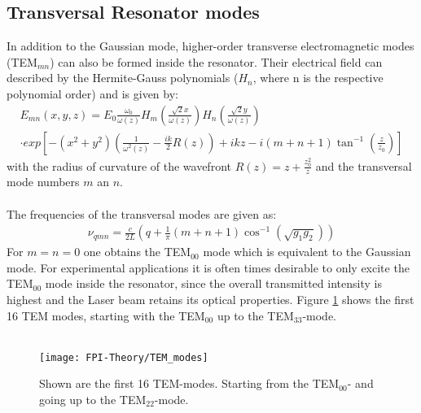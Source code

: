 \subsection{Transversal Resonator modes}
In addition to the Gaussian mode, higher-order transverse electromagnetic modes (TEM$_{mn}$) can also be formed inside the resonator. Their electrical field can described by the Hermite-Gauss polynomials ($H_n$, where n is the respective polynomial order) and is given by:
\begin{eqnarray}
	E_{mn}(x,y,z)=E_0\frac{\omega_0}{\omega(z)} H_m (\frac{\sqrt{2}x}{\omega(z)})H_n(\frac{\sqrt{2}y}{\omega(z)}) \\ \nonumber
	\cdot exp[-(x^2+y^2)(\frac{1}{\omega^2(z)}-\frac{ik}{2}R(z))+ikz-i(m+n+1)\tan^{-1}(\frac{z}{z_0})]
	\label{eq:FPI_transversal_modes_E_field} 
\end{eqnarray}
with the radius of curvature of the wavefront $R(z)= z+\frac{z_0^2}{z}$ and the transversal mode numbers $m$ an $n$. \\\\
The frequencies of the transversal modes are given as:
\begin{eqnarray}
	\nu_{qmn}= \frac{c}{2L} \left( q+ \frac{1}{\pi}(m+n+1)\cos^{-1}(\sqrt{g_1g_2}) \right )
	\label{eq:FPI_transversal_mode_frequencies} 
\end{eqnarray}
For $m=n=0$ one obtains the TEM$_{00}$ mode which is equivalent to the Gaussian mode. For experimental applications it is often times desirable to only excite the TEM$_{00}$ mode inside the resonator, since the overall transmitted intensity is highest and the Laser beam retains its optical properties. Figure \ref{figure:FPI_TEM_modes} shows the first 16 TEM modes, starting with the TEM$_{00}$ up to the TEM$_{33}$-mode. \\\\
\begin{figure}[ht]
	\centering
	\texttt{[image: FPI-Theory/TEM\_modes]}
	\caption{Shown are the first 16 TEM-modes. Starting from the TEM$_{00}$- and going up to the TEM$_{22}$-mode.}
	\label{figure:FPI_TEM_modes}
\end{figure}
\newpage
\noindent
